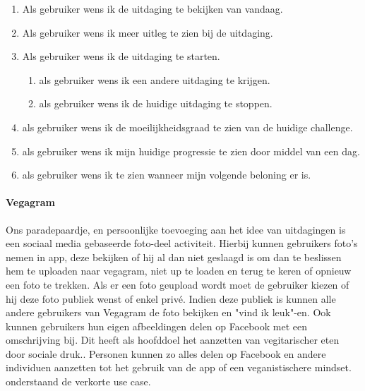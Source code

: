  \begin{enumerate}
 	\item Als gebruiker wens ik de uitdaging te bekijken van vandaag.
 	\item Als gebruiker wens ik meer uitleg te zien bij de uitdaging.
 	\item Als gebruiker wens ik de uitdaging te starten.
 	 	 \begin{enumerate}
 		\item als gebruiker wens ik een andere uitdaging te krijgen.
 		\item als gebruiker wens ik de huidige uitdaging te stoppen.
 	\end{enumerate}
 \item als gebruiker wens ik de moeilijkheidsgraad te zien van de huidige challenge.
 \item als gebruiker wens ik mijn huidige progressie te zien door middel van een dag.
 \item als gebruiker wens ik te zien wanneer mijn volgende beloning er is.
 \end{enumerate}

\paragraph{Vegagram}

Ons paradepaardje, en persoonlijke toevoeging aan het idee van uitdagingen is een sociaal media gebaseerde foto-deel activiteit. Hierbij kunnen gebruikers foto's nemen in app, deze bekijken of hij al dan niet geslaagd is om dan te beslissen hem te uploaden naar vegagram, niet up te loaden en terug te keren of opnieuw een foto te trekken. Als er een foto geupload wordt moet de gebruiker kiezen of hij deze foto publiek wenst of enkel privé. Indien deze publiek is kunnen alle andere gebruikers van Vegagram de foto bekijken en "vind ik leuk"-en. Ook kunnen gebruikers hun eigen afbeeldingen delen op Facebook met een omschrijving bij. Dit heeft als hoofddoel het aanzetten van vegitarischer eten door sociale druk.. Personen kunnen zo alles delen op Facebook en andere individuen aanzetten tot het gebruik van de app of een veganistischere mindset. onderstaand de verkorte use case.

